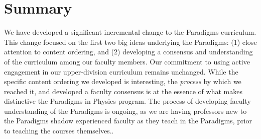 \documentclass[english,aps,pra,reprint,noshowpacs,superscriptaddress]{revtex4-1}
\begin{document}



\section{Summary}
We have developed a significant incremental change to the Paradigms
curriculum.  This change focused on the first two big ideas underlying
the Paradigms: (1) close attention to content ordering, and (2)
developing a consensus and understanding of the curriculum among our
faculty members.  Our commitment to using active engagement in our
upper-division curriculum remains unchanged.  While the specific
content ordering we developed is interesting, the \emph{process} by
which we reached it, and developed a faculty consensus is at the
essence of what makes distinctive the Paradigms in Physics program.
The process of developing faculty understanding of the Paradigms is
ongoing, as we are having professors new to the Paradigms shadow
experienced faculty as they teach in the Paradigms, prior to teaching
the courses themselves..
\end{document}
